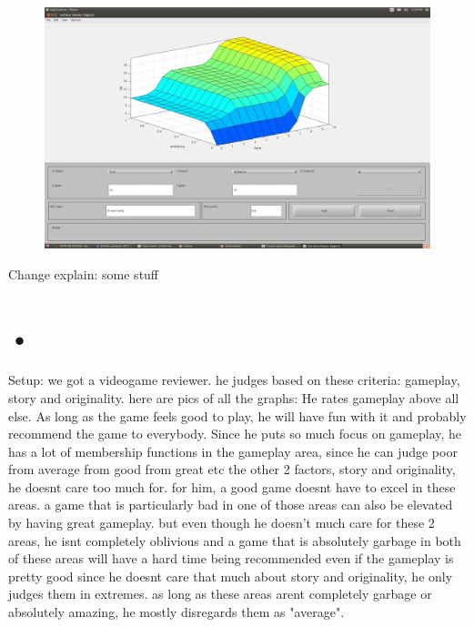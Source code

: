 \documentclass[a4paper, 11pt]{article}
\begin{document}
\begin{figure}[ht]
\includegraphics[scale=0.15]{ambience-surface-f.jpg}
\end{figure}

Change explain: some stuff

\newpage

\section{•}
Setup: we got a videogame reviewer. he judges based on these criteria: gameplay, story and originality. here are pics of all the graphs:
He rates gameplay above all else. As long as the game feels good to play, he will have fun with it and probably recommend the game to everybody.
Since he puts so much focus on gameplay, he has a lot of membership functions in the gameplay area, since he can judge poor from average from good from great etc
the other 2 factors, story and originality, he doesnt care too much for. for him, a good game doesnt have to excel in these areas. a game that is particularly bad
in one of those areas can also be elevated by having great gameplay. but even though he doesn't much care for these 2 areas, he isnt completely oblivious and a game
that is absolutely garbage in both of these areas will have a hard time being recommended even if the gameplay is pretty good
since he doesnt care that much about story and originality, he only judges them in extremes. as long as these areas arent completely garbage or absolutely amazing,
he mostly disregards them as "average".
\end{document}
